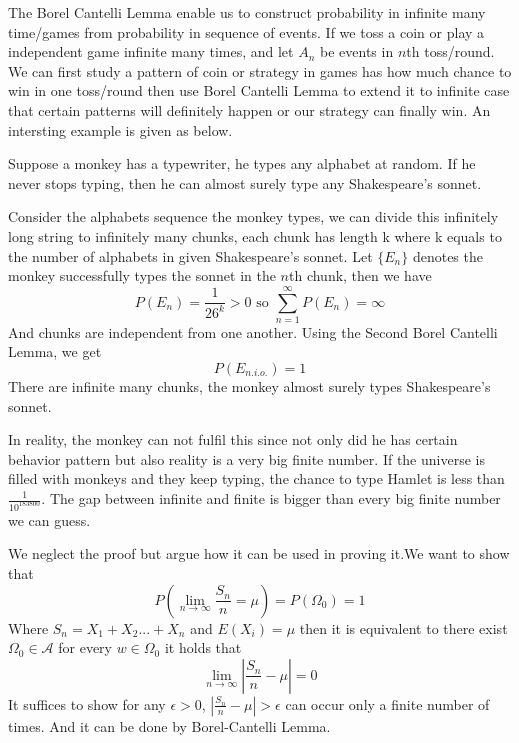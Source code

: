\documentclass[Probability_Theory.tex]{subfiles}
\begin{document}
\begin{intuition}
The Borel Cantelli Lemma enable us to construct probability in infinite many time/games from probability in sequence of events. If we toss a coin or play a independent game infinite many times, and let $A_n$ be events in $n$th toss/round. We can first study a pattern of coin or strategy in games has how much chance to win in one toss/round then use Borel Cantelli Lemma to extend it to infinite case that certain patterns will definitely happen or our strategy can finally win. An intersting example is given as below.
\end{intuition}
\begin{example}
Suppose a monkey has a typewriter, he types any alphabet at random. If he never stops typing, then he can almost surely type any Shakespeare's sonnet.
\end{example}
\begin{solve}
Consider the alphabets sequence the monkey types, we can divide this infinitely long string to infinitely many chunks, each chunk has length k where k equals to the number of alphabets in given Shakespeare's sonnet. Let $\{E_n\}$ denotes the monkey successfully types the sonnet in the $n$th chunk, then we have 
$$P(E_n)=\frac{1}{26^k}>0 \text{ so }\sum_{n=1}^\infty P(E_n)=\infty$$
And chunks are independent from one another. Using the Second Borel Cantelli Lemma, we get
$$P(E_{n.i.o.})=1$$ 
There are infinite many chunks, the monkey almost surely types Shakespeare's sonnet.
\end{solve}
\begin{remark}
In reality, the monkey can not fulfil this since not only did he has certain behavior pattern but also reality is a very big finite number. If the universe is filled with monkeys and they keep typing, the chance to type Hamlet is less than $\frac{1}{10^{183800}}$. The gap between infinite and finite is bigger than every big finite number we can guess.  
\end{remark}
\begin{example}We neglect the proof but argue how it can be used in proving it.We want to show that $$P(\lim_{n\rightarrow\infty}\frac{S_n}{n}=\mu)=P(\Omega_0)=1$$ 
Where $S_n=X_1+X_2...+X_n$ and $E(X_i)=\mu$ then it is equivalent to there exist $\Omega_0\in \mathcal{A}$ for every $w\in \Omega_0$ it holds that $$\lim_{n\rightarrow\infty}|\frac{S_n}{n}-\mu|=0$$ 
It suffices to show for any $\epsilon>0$, $|\frac{S_n}{n}-\mu|>\epsilon$ can occur only a finite number of times. And it can be done by Borel-Cantelli Lemma.
\end{example}
\end{document}
